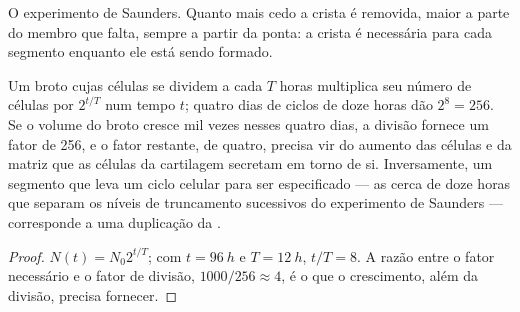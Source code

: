 \begin{omfigure}

{\small O experimento de Saunders. Quanto mais cedo a crista é
removida, maior a parte do membro que falta, sempre a partir da ponta:
a crista é necessária para cada segmento enquanto ele está sendo
formado.}
\end{omfigure}

\begin{theorem}\label{thm:b2:limb-organogenesis:growth}
Um broto cujas células se dividem a cada $T$ horas multiplica seu
número de células por $2^{t/T}$ num tempo $t$; quatro dias de ciclos de
doze horas dão
$2^{8} = 256$. Se o volume do broto cresce mil vezes nesses quatro
dias, a divisão fornece um fator de 256, e o fator restante, de quatro,
precisa vir do aumento das células e da matriz que as células da
cartilagem secretam em torno de si. Inversamente, um segmento que leva
um ciclo celular para ser especificado --- as cerca de doze horas que
separam os níveis de truncamento sucessivos do experimento de Saunders
--- corresponde a uma duplicação da .
\end{theorem}
\begin{proof}
$N(t) = N_0 2^{t/T}$; com $t = \qty{96}{h}$ e $T = \qty{12}{h}$,
$t/T = 8$. A razão entre o fator necessário e o fator de divisão,
$1000/256 \approx 4$, é o que o crescimento, além da divisão, precisa
fornecer.
\end{proof}

